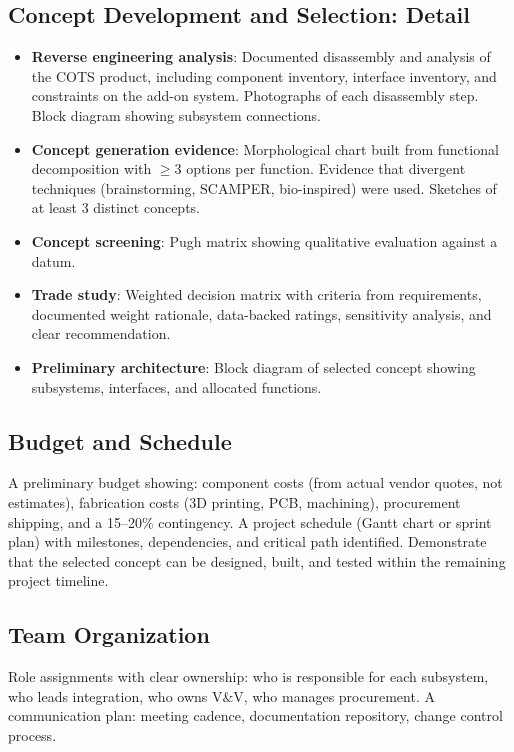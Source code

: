\subsection{Concept Development and Selection: Detail}
\begin{itemize}[leftmargin=1.5em]
\item \textbf{Reverse engineering analysis}: Documented disassembly and analysis of the COTS product, including component inventory, interface inventory, and constraints on the add-on system. Photographs of each disassembly step. Block diagram showing subsystem connections.
\item \textbf{Concept generation evidence}: Morphological chart built from functional decomposition with $\geq$3 options per function. Evidence that divergent techniques (brainstorming, SCAMPER, bio-inspired) were used. Sketches of at least 3 distinct concepts.
\item \textbf{Concept screening}: Pugh matrix showing qualitative evaluation against a datum.
\item \textbf{Trade study}: Weighted decision matrix with criteria from requirements, documented weight rationale, data-backed ratings, sensitivity analysis, and clear recommendation.
\item \textbf{Preliminary architecture}: Block diagram of selected concept showing subsystems, interfaces, and allocated functions.
\end{itemize}

\subsection{Budget and Schedule}
A preliminary budget showing: component costs (from actual vendor quotes, not estimates), fabrication costs (3D printing, PCB, machining), procurement shipping, and a 15--20\% contingency. A project schedule (Gantt chart or sprint plan) with milestones, dependencies, and critical path identified. Demonstrate that the selected concept can be designed, built, and tested within the remaining project timeline.

\subsection{Team Organization}
Role assignments with clear ownership: who is responsible for each subsystem, who leads integration, who owns V\&V, who manages procurement. A communication plan: meeting cadence, documentation repository, change control process.


